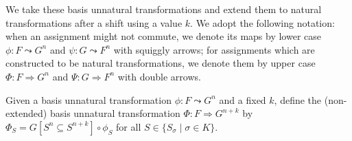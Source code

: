 We take these basis unnatural transformations and extend them to natural transformations after a shift using a value $k$.
We adopt the following notation:
when an assignment might not commute, we  denote its maps by lower case $\phi \colon F \leadsto G^n$ and $\psi\colon G \leadsto F^n$ with squiggly arrows; for assignments which are constructed to be natural transformations, we  denote them by upper case $\Phi\colon F \Rightarrow G^n$ and $\Psi\colon G \Rightarrow F^n$ with double arrows. 
\begin{definition}
\label{def:extend_unnat_trans}
Given a basis unnatural transformation $\phi\colon F \leadsto G^n$ and a fixed $k$, define the (non-extended) basis unnatural transformation $\Phi\colon F \Rightarrow G^{n+k}$ by 
$\Phi_S =  G[S^n \subseteq S^{n+k}] \circ \phi_S$
for all $S \in \{S_\sigma \mid \sigma \in K\}$. %
\end{definition}

